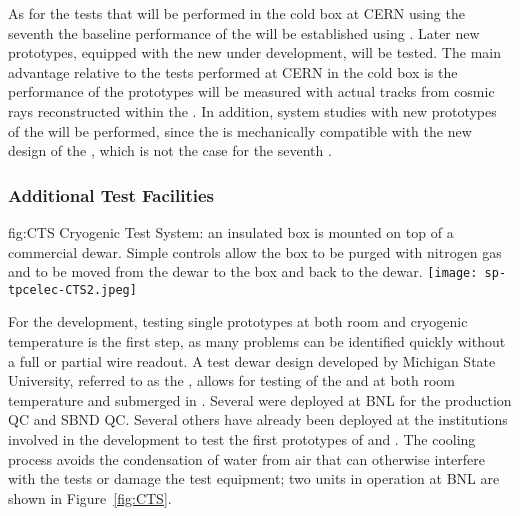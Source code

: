 As for the tests that will be performed in the cold box at CERN using the seventh
  the baseline performance of the  
will be established using  . Later new prototypes, equipped
with the new  under development, will be tested. The main advantage
relative to the tests performed at CERN in the cold box is the performance of the
 prototypes will be measured with actual tracks from cosmic rays 
reconstructed within the . In addition, system studies with new 
prototypes of the  will be performed, since the  is
mechanically compatible with the new design of the , which is not
the case for the seventh  .


\subsubsection{Additional Test Facilities}
\label{sec:fdsp-tpcelec-qa-facilities-additional}

\begin{dunefigure}
{fig:CTS}
{Cryogenic Test System: an insulated box is mounted on top of a commercial \lntwo dewar.  Simple controls allow the box to be purged with nitrogen gas and \lntwo to be moved from the dewar to the box and back to the dewar.}
\texttt{[image: sp-tpcelec-CTS2.jpeg]}
\end{dunefigure}

For the  development, testing single prototypes at both room and 
cryogenic temperature is the first step, as many problems can be identified 
quickly without a full or partial  wire readout. A test dewar 
design developed by Michigan State University, referred to as the , 
allows for testing of the  and  at both room 
temperature and submerged in \lntwo. Several  were deployed at 
BNL for the  production  QC and SBND  QC. 
Several others have already been deployed at the institutions involved in
the  development to test the first prototypes of 
and .  The  cooling process avoids the condensation 
of water from air that can otherwise interfere with the tests or damage the 
test equipment; two  units in operation at BNL are shown in Figure~\ref{fig:CTS}.

